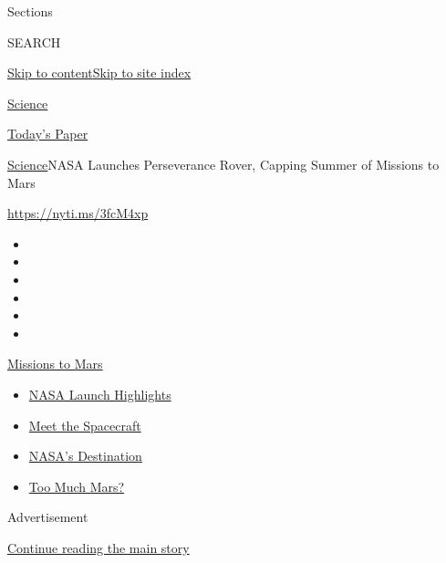 Sections

SEARCH

\protect\hyperlink{site-content}{Skip to
content}\protect\hyperlink{site-index}{Skip to site index}

\href{https://www.nytimes.com/section/science}{Science}

\href{https://myaccount.nytimes.com/auth/login?response_type=cookie\&client_id=vi}{}

\href{https://www.nytimes.com/section/todayspaper}{Today's Paper}

\href{/section/science}{Science}\textbar{}NASA Launches Perseverance
Rover, Capping Summer of Missions to Mars

\url{https://nyti.ms/3fcM4xp}

\begin{itemize}
\item
\item
\item
\item
\item
\item
\end{itemize}

\href{https://www.nytimes.com/news-event/summer-of-mars?action=click\&pgtype=Article\&state=default\&region=TOP_BANNER\&context=storylines_menu}{Missions
to Mars}

\begin{itemize}
\tightlist
\item
  \href{https://www.nytimes.com/2020/07/30/science/nasa-mars-launch.html?action=click\&pgtype=Article\&state=default\&region=TOP_BANNER\&context=storylines_menu}{NASA
  Launch Highlights}
\item
  \href{https://www.nytimes.com/interactive/2020/science/mars-perseverance-tianwen-hope.html?action=click\&pgtype=Article\&state=default\&region=TOP_BANNER\&context=storylines_menu}{Meet
  the Spacecraft}
\item
  \href{https://www.nytimes.com/2020/07/28/science/nasa-jezero-perseverance.html?action=click\&pgtype=Article\&state=default\&region=TOP_BANNER\&context=storylines_menu}{NASA's
  Destination}
\item
  \href{https://www.nytimes.com/2020/07/28/science/mars-nasa-science.html?action=click\&pgtype=Article\&state=default\&region=TOP_BANNER\&context=storylines_menu}{Too
  Much Mars?}
\end{itemize}

Advertisement

\protect\hyperlink{after-top}{Continue reading the main story}

